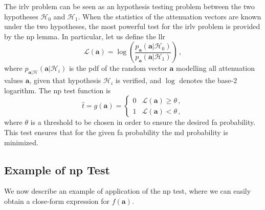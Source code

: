 \documentclass[conference,final]{IEEEtran}
\begin{document}
The \ac{irlv} problem can be seen as an hypothesis testing problem between the two hypotheses $\mathcal H_0$ and $\mathcal H_1$. When the statistics of the attenuation vectors are known under the two hypotheses, the most powerful test for the \ac{irlv} problem is provided by the \ac{np} lemma. In particular, let us  define the \ac{llr}
\begin{equation}\label{eq:lr}
    \mathcal{L}{(\bm a)}=\log\left(\frac{p_{\bm a}(\bm a|\mathcal{H}_0)}{p_{\bm a}(\bm a|\mathcal{H}_1)}\right)\,,
\end{equation}
where $p_{\bm a|\mathcal{H}}(\bm a|\mathcal{H}_i)$ is the \ac{pdf} of the random vector $\bm a$ modelling all attenuation values $\bm a$, given that hypothesis $\mathcal H_i$ is verified, and $\log$ denotes the base-2 logarithm. The \ac{np} test function is 
\begin{equation}
\label{eq:thrOpt}
    \hat{t} = g(\bm a) = \begin{cases}
    0 & \mathcal{L}{(\bm a)} \geq \theta\,, \\ 
    1 & \mathcal{L}{(\bm a)} < \theta\,, 
    \end{cases}
\end{equation}
where $\theta$ is a threshold to be chosen in order to ensure the desired \ac{fa} probability. This test ensures that for the given \ac{fa} probability the \ac{md} probability is minimized. 

\subsection{Example of \ac{np} Test}
\label{sec:los}
We now describe an example of application of the \ac{np} test, where we can easily obtain a close-form expression for $f(\bm a)$. 
\end{document}
